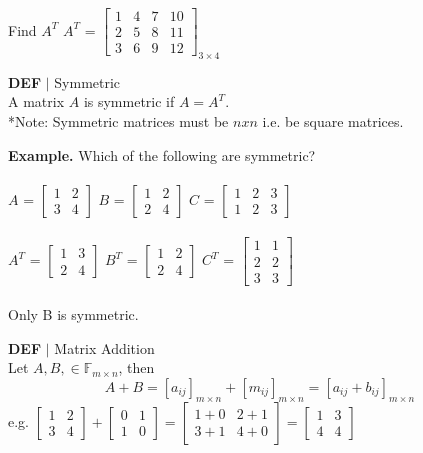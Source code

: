\documentclass [12pt]{article}
\begin{document}
Find $A^T$\indent
$A^T$ = 
$\begin{bmatrix}
1&4&7&10\\
2&5&8&11\\
3&6&9&12
\end{bmatrix}_{3\times4}$\\
\begin{framed}
\noindent\textbf{DEF} $|$ Symmetric\\
A matrix $A$ is symmetric if $A=A^T$.\\
*Note: Symmetric matrices must be $nxn$ i.e. be square matrices.
\end{framed}
\noindent\textbf{Example.} Which of the following are symmetric?\\\\
$A$ = $\begin{bmatrix}
1&2\\
3&4
\end{bmatrix}$\indent
$B$ = $\begin{bmatrix}
1&2\\
2&4
\end{bmatrix}$\indent
$C$ = $\begin{bmatrix}
1&2&3\\
1&2&3
\end{bmatrix}$
\\\\
$A^T$ = $\begin{bmatrix}
1&3\\
2&4
\end{bmatrix}$\indent
$B^T$ = $\begin{bmatrix}
1&2\\
2&4
\end{bmatrix}$\indent
$C^T$ = $\begin{bmatrix}
1&1\\
2&2\\
3&3
\end{bmatrix}$\\\\
Only B is symmetric.
\begin{framed}
\noindent\textbf{DEF} $|$ Matrix Addition\\
Let $A,B,\in\mathbb{F}_{m\times n}$, then 
\[A+B=[a_{ij}]_{m\times n}+[m_{ij}]_{m\times n} =  [a_{ij}+b_{ij}]_{m\times n}\]
e.g. $\begin{bmatrix}
1&2\\
3&4
\end{bmatrix}+\begin{bmatrix}
0&1\\
1&0
\end{bmatrix}=\begin{bmatrix}
1+0&2+1\\
3+1&4+0
\end{bmatrix}=\begin{bmatrix}
1&3\\
4&4
\end{bmatrix}$
\end{framed}
\end{document}
